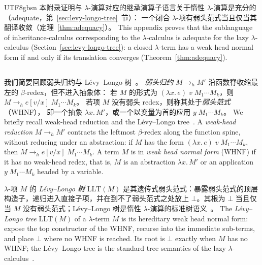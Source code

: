 \begin{CJK*}{UTF8}{gbsn}
\ifPaperChinese
本附录证明与 $\lambda$-演算对应的继承演算子语言关于惰性
$\lambda$-演算是充分的（adequate，第~\ref{sec:levy-longo-tree}~节）：
一个闭合 $\lambda$-项有弱头范式当且仅当其翻译收敛（定理~\ref{thm:adequacy}）。
\else
This appendix proves that the sublanguage of
inheritance-calculus corresponding to the $\lambda$-calculus
is adequate for the lazy $\lambda$-calculus
(Section~\ref{sec:levy-longo-tree}):
a closed $\lambda$-term has a weak head normal form if and only
if its translation converges (Theorem~\ref{thm:adequacy}).
\fi

\subsection{}

\ifPaperChinese
我们简要回顾弱头归约与 Lévy--Longo 树~\cite{levy1978-reductions-lambda-calcul, longo1983-set-theoretical-models}。
\emph{弱头归约} $M \to_h M'$ 沿函数脊收缩最左的 $\beta$-redex，但不进入抽象体：
若 $M$ 的形式为 $(\lambda x.\, e)\; v\; M_1 \cdots M_k$，则
$M \to_h e[v/x]\; M_1 \cdots M_k$。
若项 $M$ 没有弱头 redex，则称其处于\emph{弱头范式}（WHNF），
即一个抽象 $\lambda x.\, M'$，或一个以变量为首的应用 $y\; M_1 \cdots M_k$。
\else
We briefly recall weak-head reduction and the
L\'evy--Longo tree~\cite{levy1978-reductions-lambda-calcul, longo1983-set-theoretical-models}.
A \emph{weak-head reduction} $M \to_h M'$ contracts the
leftmost $\beta$-redex along the function spine, without
reducing under an abstraction: if $M$ has the form
$(\lambda x.\, e)\; v\; M_1 \cdots M_k$, then
$M \to_h e[v/x]\; M_1 \cdots M_k$.
A term $M$ is in \emph{weak head normal form} (WHNF) if it has
no weak-head redex, that is, $M$ is an abstraction
$\lambda x.\, M'$ or an application $y\; M_1 \cdots M_k$ headed
by a variable.
\fi

\ifPaperChinese
$\lambda$-项 $M$ 的 \emph{Lévy--Longo 树} $\mathrm{LLT}(M)$ 是其遗传式弱头范式：暴露弱头范式的顶层构造子，递归进入直接子项，并在到不了弱头范式之处放上 $\bot$。其根为 $\bot$ 当且仅当 $M$ 没有弱头范式；Lévy--Longo 树是惰性 $\lambda$-演算的标准树语义~\cite{abramsky1993-full-abstraction-lazy-lambda}。
\else
The \emph{L\'evy--Longo tree} $\mathrm{LLT}(M)$ of a
$\lambda$-term $M$ is its hereditary weak head normal form:
expose the top constructor of the WHNF, recurse into the
immediate sub-terms, and place $\bot$ where no WHNF is reached.
Its root is $\bot$ exactly when $M$ has no WHNF; the
L\'evy--Longo tree is the standard tree semantics of the lazy
$\lambda$-calculus~\cite{abramsky1993-full-abstraction-lazy-lambda}.
\fi


\end{CJK*}
